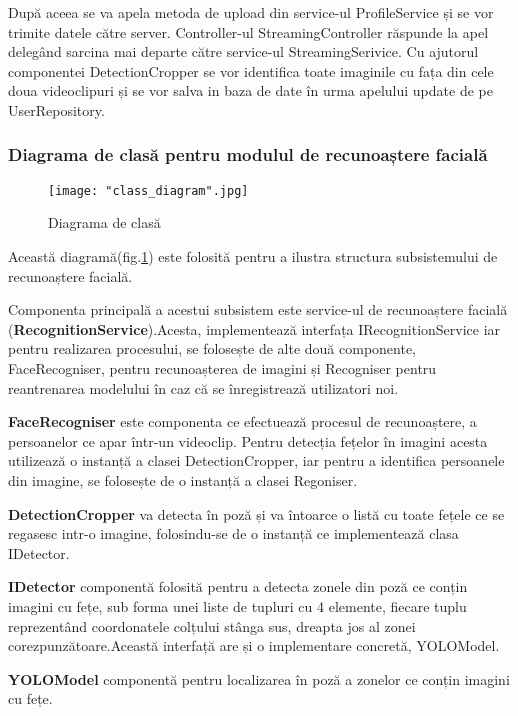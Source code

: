 \documentclass[a4paper, 12pt]{article}
\begin{document}
	\quad După aceea se va apela metoda de upload din service-ul ProfileService și se vor trimite datele către server. Controller-ul StreamingController răspunde la apel delegând sarcina mai departe către service-ul StreamingSerivice.
	Cu ajutorul componentei DetectionCropper se vor identifica toate imaginile cu fața din cele doua videoclipuri și se vor salva in baza de date în urma apelului update de pe UserRepository.
	\bigskip
	\subsubsection{Diagrama de clasă pentru modulul de recunoaștere facială}
	\begin{figure}[H]
		\centering
		\texttt{[image: "class\_diagram".jpg]}
		\caption{Diagrama de clasă}\label{fig:class_diagram}
	\end{figure}
	
	\quad Această diagramă(fig.\ref{fig:class_diagram}) este folosită pentru a ilustra structura subsistemului de recunoaștere facială.
	
	\quad Componenta principală a acestui subsistem este service-ul de recunoaștere facială (\textbf{RecognitionService}).Acesta, implementează interfața IRecognitionService iar pentru realizarea procesului, se folosește de alte două componente, FaceRecogniser, pentru recunoașterea de imagini și Recogniser pentru reantrenarea modelului în caz că se înregistrează utilizatori noi.
	
	\quad \textbf{FaceRecogniser} este componenta ce efectuează procesul de recunoaștere, a persoanelor ce apar într-un videoclip. Pentru detecția fețelor în imagini acesta utilizează o instanță a clasei DetectionCropper, iar pentru a identifica persoanele din imagine, se folosește de o instanță a clasei Regoniser.
	
	\quad \textbf{DetectionCropper} va detecta în poză și va întoarce o listă cu toate fețele ce se regasesc intr-o imagine, folosindu-se de o instanță ce implementează clasa IDetector. 
	
	\quad \textbf{IDetector} componentă folosită pentru a detecta zonele din poză ce conțin imagini cu fețe, sub forma unei liste de tupluri cu 4 elemente, fiecare tuplu reprezentând coordonatele colțului stânga sus, dreapta jos al zonei corezpunzătoare.Această interfață are și o implementare concretă, YOLOModel.
	
	\quad \textbf{YOLOModel} componentă pentru localizarea în poză a zonelor ce conțin imagini cu fețe.
	
\end{document}
